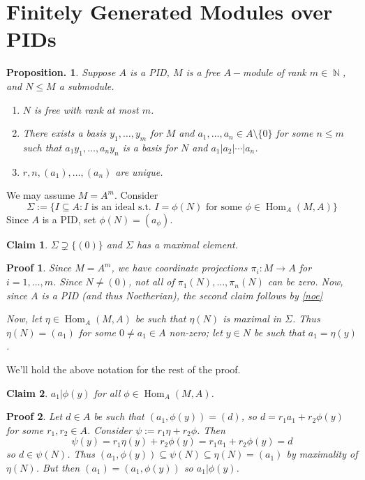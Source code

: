 \documentclass[11pt, a4paper]{memoir}
\DeclareMathOperator{\N}{{\mathbb{N}}}
\theoremstyle{change}
\newtheorem{proposition}[theorem]{Proposition.}
\theoremstyle{plain}
\newtheorem{claim}{Claim}
\theoremstyle{nonumberplain}
\newtheorem{nmproof}{Proof}
\DeclareMathOperator{\Hom}{Hom}
\numberwithin{equation}{section}
\begin{document}
\section{Finitely Generated Modules over PIDs}
\begin{proposition}\label{ftpid-prop}
    Suppose $A$ is a PID, $M$ is a free $A-$module of rank $m\in\N$, and $N\leq M$ a submodule.
    \begin{enumerate}[nolistsep,label=(\roman*)]
        \item $N$ is free with rank at most $m$.
        \item There exists a basis $y_1,\ldots,y_m$ for $M$ and $a_1,\ldots,a_n\in A\setminus\{0\}$ for some $n\leq m$ such that $a_1y_1,\ldots,a_ny_n$ is a basis for $N$ and $a_1|a_2|\cdots|a_n$.
        \item $r,n,(a_1),\ldots,(a_n)$ are unique.
    \end{enumerate}
\end{proposition}
We may assume $M=A^m$.
Consider
\begin{equation*}
    \Sigma:=\{I\subseteq A:I\text{ is an ideal s.t. }I=\phi(N)\text{ for some }\phi\in\Hom_A(M,A)\}
\end{equation*}
Since $A$ is a PID, set $\phi(N)=(a_\phi)$.
\begin{claim}
    $\Sigma\supsetneq\{(0)\}$ and $\Sigma$ has a maximal element.
\end{claim}
\begin{nmproof}
    Since $M=A^m$, we have coordinate projections $\pi_i:M\to A$ for $i=1,\ldots,m$.
    Since $N\neq(0)$, not all of $\pi_1(N),\ldots,\pi_n(N)$ can be zero.
    Now, since $A$ is a PID (and thus Noetherian), the second claim follows by \cref{noe}

    Now, let $\eta\in\Hom_A(M,A)$ be such that $\eta(N)$ is maximal in $\Sigma$.
    Thus $\eta(N)=(a_1)$ for some $0\neq a_1\in A$ non-zero; let $y\in N$ be such that $a_1=\eta(y)$.
\end{nmproof}
We'll hold the above notation for the rest of the proof.
\begin{claim}
    $a_1|\phi(y)$ for all $\phi\in\Hom_A(M,A)$.
\end{claim}
\begin{nmproof}
    Let $d\in A$ be such that $(a_1,\phi(y))=(d)$, so $d=r_1a_1+r_2\phi(y)$ for some $r_1,r_2\in A$.
    Consider $\psi:=r_1\eta+r_2\phi$.
    Then
    \begin{equation*}
        \psi(y)=r_1\eta(y)+r_2\phi(y)=r_1a_1+r_2\phi(y)=d
    \end{equation*}
    so $d\in \psi(N)$.
    Thus $(a_1,\phi(y))\subseteq\psi(N)\subseteq\eta(N)=(a_1)$ by maximality of $\eta(N)$.
    But then $(a_1)=(a_1,\phi(y))$ so $a_1|\phi(y)$.
\end{nmproof}
\end{document}
